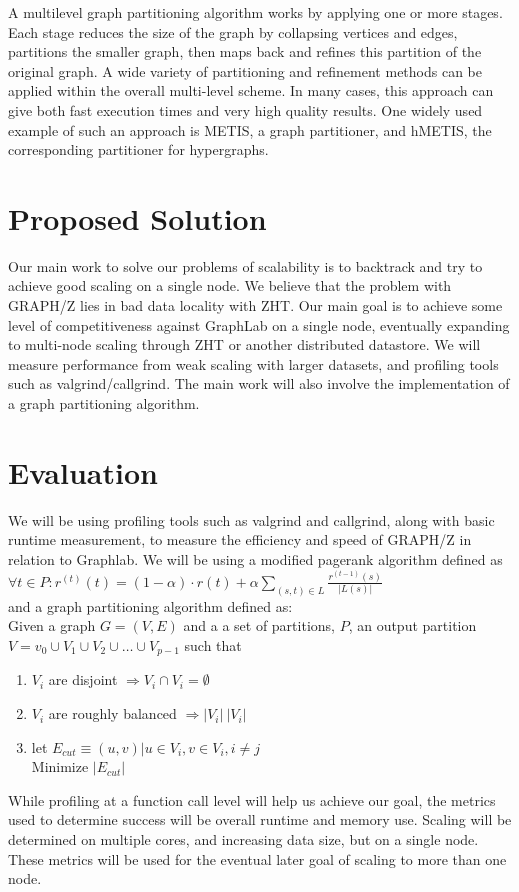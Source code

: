 \documentclass[10pt]{article}
\begin{document}
\begin{multicols}{2}
  A multilevel graph partitioning algorithm works by applying one or more stages. Each stage reduces the size of the graph by collapsing vertices and edges, partitions the smaller graph, then maps back and refines this partition of the original graph. A wide variety of partitioning and refinement methods can be applied within the overall multi-level scheme. In many cases, this approach can give both fast execution times and very high quality results. One widely used example of such an approach is METIS, a graph partitioner, and hMETIS, the corresponding partitioner for hypergraphs.
  
  \section{Proposed Solution}
  Our main work to solve our problems of scalability is to backtrack and try to achieve good scaling on a single node. We believe that the problem with GRAPH/Z lies in bad data locality with ZHT. Our main goal is to achieve some level of competitiveness against GraphLab on a single node, eventually expanding to multi-node scaling through ZHT or another distributed datastore. We will measure performance from weak scaling with larger datasets, and profiling tools such as valgrind/callgrind. The main work will also involve the implementation of a graph partitioning algorithm.
  
  \section{Evaluation}
  We will be using profiling tools such as valgrind and callgrind, along with basic runtime measurement, to measure the efficiency and speed of GRAPH/Z in relation to Graphlab. We will be using a modified pagerank algorithm defined as \\
  $\forall t \in P : r^{(t)}(t)  = (1-\alpha) \cdot r(t) + \alpha \sum_{(s,t) \in L} \frac{r^{(t-1)}(s)}{|L(s)|}$\\ 
  and a graph partitioning algorithm defined as:\\
  Given a graph $G = (V,E)$ and a a set of partitions, $P$, an output partition $V = v_0 \cup V_1 \cup V_2 \cup \ldots \cup V_{p-1}$ such that
  \begin{enumerate}
  \item ${V_i}$ are disjoint $\Rightarrow V_i \cap V_i = \emptyset$
  \item ${V_i}$ are roughly balanced $\Rightarrow |V_i| ~ |V_i|$
  \item let $E_{cut} \equiv {(u,v) | u \in V_i, v \in V_i, i \neq j}$\\
    Minimize $|E_{cut}|$
  \end{enumerate}
  While profiling at a function call level will help us achieve our goal, the metrics used to determine success will be overall runtime and memory use. Scaling will be determined on multiple cores, and increasing data size, but on a single node.  These metrics will be used for the eventual later goal of scaling to more than one node.
\end{multicols}
\end{document}
